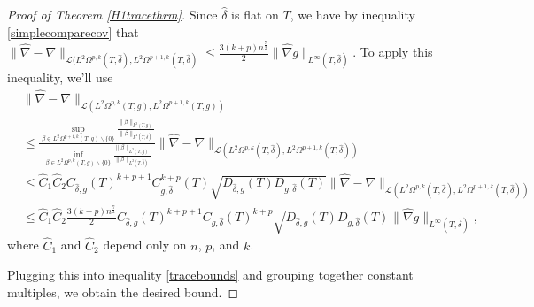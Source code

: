 \documentclass[10pt,a4paper]{amsart}
\begin{document}
\begin{proof}[Proof of Theorem \ref{H1tracethrm}]
Since $\hat \delta$ is flat on $T$, we have by inequality \ref{simplecomparecov} that $\|\hat \nabla - \nabla\|_{\mathcal{L}(L^2\Omega^{p,k}(T,\hat \delta),L^2\Omega^{p+1,k}(T,\hat \delta)} \le \frac{3(k+p)n^\frac{7}{2}}{2}\|\hat \nabla g\|_{L^\infty(T,\hat \delta)}$. To apply this inequality, we'll use
\begin{align*}
&\|\hat \nabla - \nabla\|_{\mathcal{L}(L^2\Omega^{p,k}(T,g),L^2\Omega^{p+1,k}(T,g))} \\ 
&\le \frac{\sup_{\beta \in L^2\Omega^{p+1,k}(T,g) \backslash \{0\}} \frac{\|\beta\|_{L^2(T,g)}}{\|\beta\|_{L^2(T,\hat \delta)}}}{\inf_{\beta \in L^2\Omega^{p,k}(T,g) \backslash \{0\}}\frac{\|\beta\|_{L^2(T,g)}}{\|\beta\|_{L^2(T,\hat \delta)}}} \|\hat \nabla - \nabla\|_{\mathcal{L}(L^2\Omega^{p,k}(T,\hat \delta),L^2\Omega^{p+1,k}(T,\hat \delta))} \\
&\le \hat C_1\hat C_2 C_{\hat \delta,g}(T)^{k+p + 1}C_{g,\hat \delta}^{k+p}(T)\sqrt{D_{\hat \delta,g}(T)D_{g,\hat \delta}(T)}\|\hat \nabla - \nabla\|_{\mathcal{L}(L^2\Omega^{p,k}(T,\hat \delta),L^2\Omega^{p+1,k}(T,\hat \delta))} \\
&\le \hat C_1 \hat C_2 \frac{3(k+p)n^\frac{7}{2}}{2}C_{\hat \delta,g}(T)^{k+p+1}C_{g,\hat \delta}(T)^{k+p}\sqrt{D_{\hat \delta,g}(T)D_{g,\hat \delta}(T)} \|\hat \nabla g\|_{L^\infty(T,\hat \delta)},
\end{align*}
where $\hat C_1$ and $\hat C_2$ depend only on $n$, $p$, and $k$.

Plugging this into inequality \ref{tracebounds} and grouping together constant multiples, we obtain the desired bound.

\end{proof}
\end{document}
